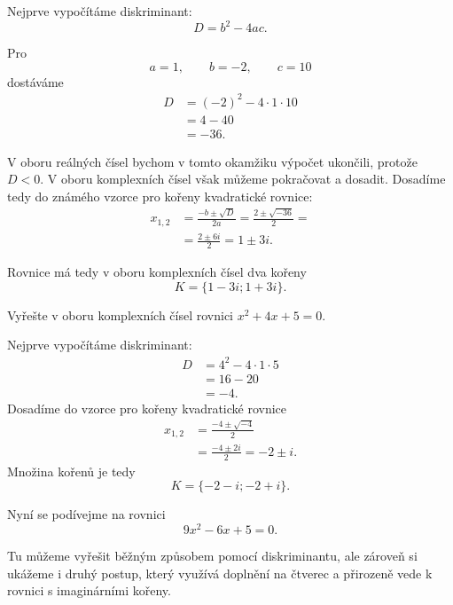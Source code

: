\documentclass[12pt,a4paper]{article}
\begin{document}
Nejprve vypočítáme diskriminant:
\[
    D=b^2-4ac.
\]

Pro
\[
    a=1,\qquad b=-2,\qquad c=10
\]
dostáváme
\begin{align*}
    D   &=(-2)^2-4\cdot1\cdot10\\
        &=4-40\\
        &=-36.
\end{align*}

V oboru reálných čísel bychom v tomto okamžiku výpočet ukončili, 
protože $D<0$. V oboru komplexních čísel však můžeme pokračovat a dosadit.
Dosadíme tedy do známého vzorce pro kořeny kvadratické rovnice:
\begin{align*}
    x_{1,2} &=  \frac{-b\pm\sqrt{D}}{2a} = \frac{2\pm\sqrt{-36}}{2} =\\
            &= \frac{2 \pm 6i}{2} = 1\pm3i.
\end{align*}

Rovnice má tedy v oboru komplexních čísel dva kořeny
\[
    K=\{1-3i; 1+3i\}.
\]

\begin{examplebox}
    Vyřešte v oboru komplexních čísel rovnici $x^2+4x+5=0$.
    
    Nejprve vypočítáme diskriminant:
    \begin{align*}
        D
        &=4^2-4\cdot1\cdot5 \\
        &=16-20 \\
        &=-4.
    \end{align*}
    Dosadíme do vzorce pro kořeny kvadratické rovnice
    \begin{align*}
        x_{1,2} &= \frac{-4\pm \sqrt{-4}}{2} \\
                &= \frac{-4\pm 2i}{2} = -2\pm i.
    \end{align*}
    Množina kořenů je tedy
    \[
        K=\{-2-i;-2+i\}.
    \]
\end{examplebox}

Nyní se podívejme na rovnici
\[
    9x^2-6x+5=0.
\]

Tu můžeme vyřešit běžným způsobem pomocí diskriminantu, 
ale zároveň si ukážeme i druhý postup, který využívá doplnění na čtverec 
a přirozeně vede k rovnici s imaginárními kořeny.
\end{document}
